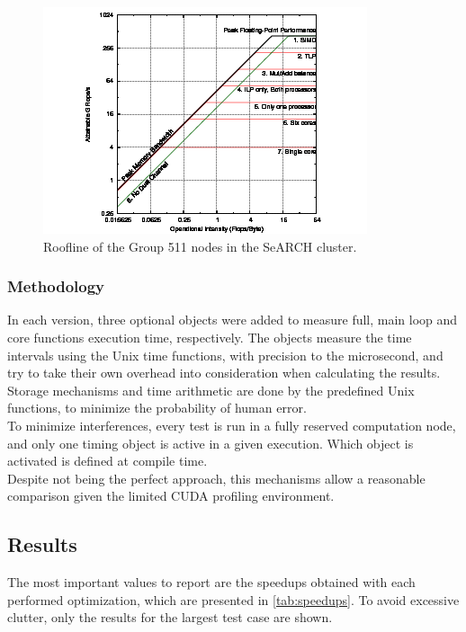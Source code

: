 \documentclass[9pt,twocolumn]{scrartcl}
\begin{document}
\begin{figure}[!htp]
	\begin{center}
		\includegraphics[width=\columnwidth]{images/roofline511}
	\end{center}
	\caption{Roofline of the Group 511 nodes in the SeARCH cluster.}
	\label{fig:roofline.511}
\end{figure}

\subsubsection{Methodology}
In each version, three optional objects were added to measure full, main loop and core functions execution time, respectively. The objects measure the time intervals using the Unix time functions, with precision to the microsecond, and try to take their own overhead into consideration when calculating the results. Storage mechanisms and time arithmetic are done by the predefined Unix functions, to minimize the probability of human error.\\

To minimize interferences, every test is run in a fully reserved computation node, and only one timing object is active in a given execution. Which object is activated is defined at compile time.\\

Despite not being the perfect approach, this mechanisms allow a reasonable comparison given the limited CUDA profiling environment.\\

\subsection{Results}
\label{sec:omp:results}
The most important values to report are the speedups obtained with each performed optimization, which are presented in \autoref{tab:speedups}. To avoid excessive clutter, only the results for the largest test case are shown.\\
\end{document}
